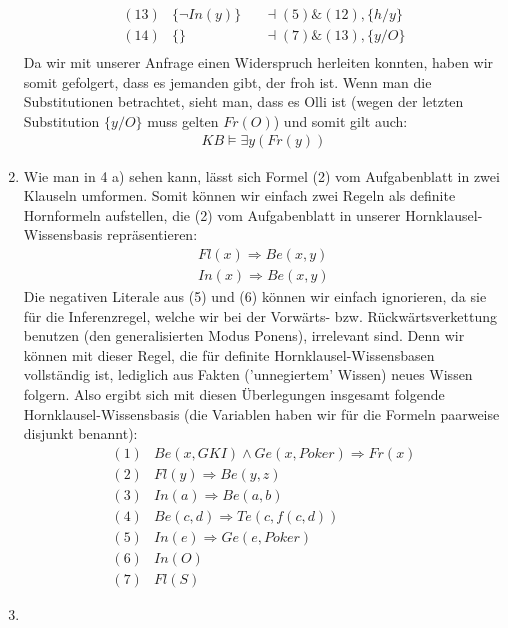 \documentclass[a4paper,10pt]{article}
\begin{document}
\begin{enumerate}[~~a)]
\begin{align*}
(13) &\{\lnot In(y)\} &&\dashv (5) \& (12), \{h/y\}\\
(14) &\{\} && \dashv (7) \& (13), \{y/O\}\\
\end{align*}
Da wir mit unserer Anfrage einen Widerspruch herleiten konnten, haben wir somit gefolgert, dass es jemanden gibt, der froh ist. Wenn man die Substitutionen betrachtet, sieht man, dass es Olli ist (wegen der letzten Substitution $\{y/O\}$ muss gelten $Fr(O)$) und somit gilt auch:
\begin{align*}
KB \vDash \exists y (Fr(y))
\end{align*}
    \item
Wie man in 4 a) sehen kann, lässt sich Formel (2) vom Aufgabenblatt in zwei Klauseln umformen. Somit können wir einfach zwei Regeln als definite Hornformeln aufstellen, die (2) vom Aufgabenblatt in unserer Hornklausel-Wissensbasis repräsentieren:
\begin{align*}
Fl(x) \Rightarrow Be(x,y)\\
In (x) \Rightarrow Be(x,y)
\end{align*}
Die negativen Literale aus (5) und (6) können wir einfach ignorieren, da sie für die Inferenzregel, welche wir bei der Vorwärts- bzw. Rückwärtsverkettung benutzen (den generalisierten Modus Ponens), irrelevant sind. Denn wir können mit dieser Regel, die für definite Hornklausel-Wissensbasen vollständig ist, lediglich aus Fakten ('unnegiertem' Wissen) neues Wissen folgern.
Also ergibt sich mit diesen Überlegungen insgesamt folgende Hornklausel-Wissensbasis (die Variablen haben wir für die Formeln paarweise disjunkt benannt):
\begin{align*}
(1) &Be(x,GKI)\land Ge(x,Poker) \Rightarrow Fr(x)\\
(2) &Fl(y) \Rightarrow Be(y,z)\\
(3) &In (a) \Rightarrow Be(a,b)\\
(4) &Be(c,d) \Rightarrow Te(c,f(c,d))\\
(5) &In(e) \Rightarrow Ge(e,Poker)\\
(6) &In(O)\\
(7) &Fl(S)
\end{align*}
    \item


\end{enumerate}
\end{document}
